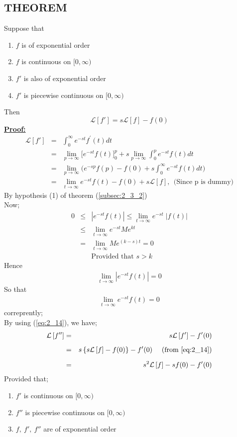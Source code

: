 \documentclass[11pt]{report}
\newcommand{\Laplace}{\mathcal{L}}
\newcommand{\ft}{f(t)}
\newcommand{\ftp}[1]{f^{#1}(t)}
\newcommand{\sbracket}[1]{\left[#1\right]}
\newcommand{\LFn}[1]{\Laplace \sbracket{#1}}
\newcommand{\ubt}[1]{\textbf{\underline{#1}}}
\newcommand{\sps}{\\[0.2cm]}
\newcommand{\refn}[1]{(\ref{#1})}
\newcommand{\refx}[1]{\refn{eq:#1}}
\newcommand{\sprime}{'}
\newcommand{\dprime}{''}
\newcommand{\inte}{\int_0^\infty e^{-st}}
\begin{document}
	\subsection{THEOREM}
	Suppose that
	\begin{enumerate}
		\item $f$ is of exponential order
		\item $f$ is continuous on $[0, \infty)$
		\item $f\sprime$ is also of exponential order
		\item $f\sprime$ is piecewise continuous on $[0, \infty)$
	\end{enumerate}
	Then
	\begin{equation}
		\LFn{f\sprime} = s\LFn{f} - f(0)
		\label{eq:2_14}
	\end{equation}	
	\ubt{Proof:}
	\begin{eqnarray*}
		\LFn{f\sprime} &=&\inte \ftp{\sprime}dt\sps
		&=& \lim\limits_{p\rightarrow\infty}\Big[ e^{-st}\ft  \Big]_0^p + s\lim\limits_{p\rightarrow\infty}\int_0^p e^{-st}\ft dt\sps
		&=&\lim\limits_{p\rightarrow\infty}\Big( e^{-sp} f(p) - f(0) + s\inte\ft dt \Big)\sps
		&=& \lim\limits_{t\rightarrow\infty} e^{-st}\ft - f(0)+ s\LFn{f}, ~~\text{(Since p is dummy)}
	\end{eqnarray*}
	By hypothesis (1) of theorem (\ref{subsec:2_3_2})\\
	Now;
	\begin{eqnarray*}
		0 &\leq& \left|e^{-st}\ft\right| \leq \lim\limits_{t\rightarrow\infty} e^{-st}\;\big|\ft\big|\sps
		&\leq& \lim\limits_{t\rightarrow\infty} e^{-st}Me^{kt}\sps
		&=& \lim\limits_{t\rightarrow\infty}Me^{(k-s)t} = 0\sps
		&&\text{Provided that } s > k
	\end{eqnarray*}
	Hence
	\begin{eqnarray*}
		\lim\limits_{t\rightarrow\infty}\left| e^{-st} \ft \right| = 0
	\end{eqnarray*}
	So that
	\begin{eqnarray*}
		\lim\limits_{t\rightarrow\infty} e^{-st}\ft = 0
	\end{eqnarray*}
	correprently;\\
	By using \refx{2_14}, we have;
	\begin{eqnarray*}
		\LFn{f\dprime} &=& s\LFn{f\sprime} - f\sprime(0)\sps
		&=& s\left\{s\LFn{f} - f(0)\right\}-f\sprime(0) ~~~~ \text{(from \ref{eq:2_14})}\sps
		&=& s^2\LFn{f}-sf(0) - f\sprime(0)
	\end{eqnarray*}
	Provided that;
	\begin{enumerate}
		\item $f\sprime$ is continuous on $[0, \infty)$
		\item $f\dprime$ is piecewise continuous on $[0, \infty)$
		\item $f,~f\sprime,~f\dprime$ are of exponential order
	\end{enumerate}
\end{document}
